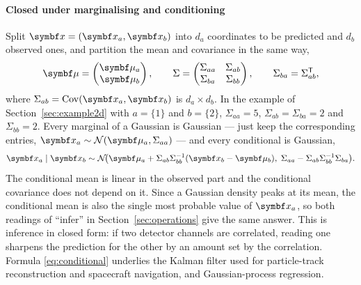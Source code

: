 \documentclass[11pt]{article}
\begin{document}
\paragraph{Closed under marginalising and conditioning} Split $\x = (\x_a, \x_b)$ into $d_a$ coordinates to be
predicted and $d_b$ observed ones, and partition the mean and covariance in the same way,
\[
  \vmu = \begin{pmatrix} \vmu_a \\ \vmu_b \end{pmatrix}, \qquad
  \Sigma = \begin{pmatrix} \Sigma_{aa} & \Sigma_{ab} \\ \Sigma_{ba} & \Sigma_{bb} \end{pmatrix}, \qquad
  \Sigma_{ba} = \Sigma_{ab}\T ,
\]
where $\Sigma_{ab} = \Cov(\x_a, \x_b)$ is $d_a \times d_b$. In the example of Section~\ref{sec:example2d} with
$a = \{1\}$ and $b = \{2\}$, $\Sigma_{aa} = 5$, $\Sigma_{ab} = \Sigma_{ba} = 2$ and $\Sigma_{bb} = 2$. Every marginal of a Gaussian is Gaussian --- just keep the corresponding entries,
$\x_a \sim \Normal(\vmu_a, \Sigma_{aa})$ --- and every conditional is Gaussian,
\begin{equation}\label{eq:conditional}
  \x_a \mid \x_b \sim \Normal\!\big( \vmu_a + \Sigma_{ab}\Sigma_{bb}^{-1}(\x_b - \vmu_b),\;
  \Sigma_{aa} - \Sigma_{ab}\Sigma_{bb}^{-1}\Sigma_{ba} \big).
\end{equation}
The conditional mean is linear in the observed part and the conditional covariance does not depend on it. Since a
Gaussian density peaks at its mean, the conditional mean is also the single most probable value of $\x_a$, so both
readings of ``infer'' in Section~\ref{sec:operations} give the same answer. This is
inference in closed form: if two detector channels are correlated, reading one sharpens the prediction for the
other by an amount set by the correlation. Formula \eqref{eq:conditional} underlies the Kalman filter used for
particle-track reconstruction and spacecraft navigation, and Gaussian-process regression.
\end{document}
